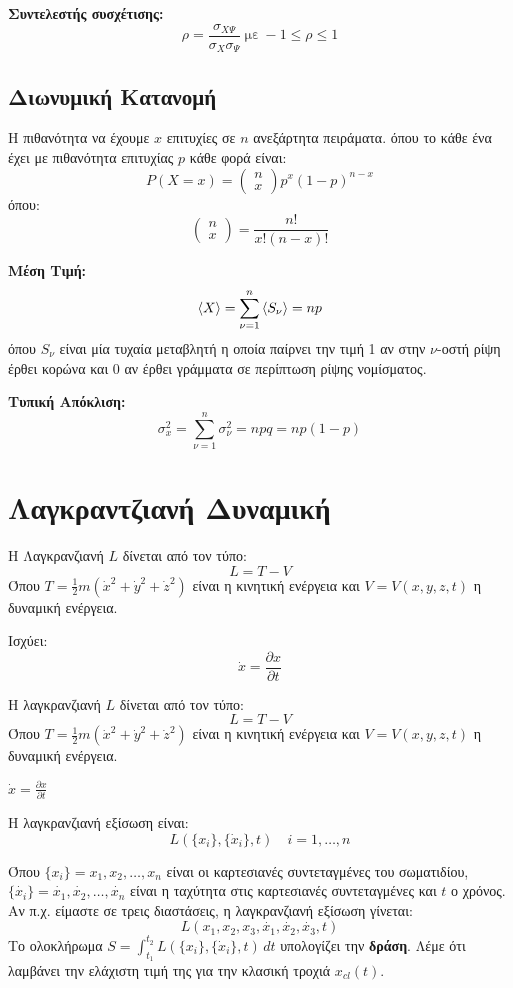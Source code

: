 \documentclass[11pt, oneside]{article}   	%
\newcommand{\definition}[1]{
	\begin{tcolorbox}[colback=blue!5!white,colframe=blue!75!black,title=\textbf{Ορισμός}]
		\begin{center}
			#1
		\end{center}
	\end{tcolorbox}
}
\newcommand{\note}[1]{
	\begin{tcolorbox}[colback=yellow!5!white,colframe=yellow!75!black,title=\textbf{Σημείωση}]
		\begin{center}
			#1
		\end{center}
	\end{tcolorbox}
}
\begin{document}
\definition{\textbf{Συντελεστής συσχέτισης:}\[\rho = \frac{\sigma_{X\Psi}}{\sigma_X \sigma_\Psi} \ \text{με} \ -1 \leq \rho \leq 1\]}

\subsection{Διωνυμική Κατανομή}

\definition{Η πιθανότητα να έχουμε 
$x$ επιτυχίες σε 
$n$ ανεξάρτητα πειράματα. όπου το κάθε ένα έχει με πιθανότητα επιτυχίας
$p$ κάθε φορά είναι:
\[P(X=x) = \begin{pmatrix}
n \\ x
\end{pmatrix} p^x (1-p)^{n-x}\] όπου: \[\begin{pmatrix} n \\ x \end{pmatrix} = \frac{n!}{x!(n-x)!}\]}

\definition{\textbf{Μέση Τιμή:}\[\braket{X} = \sum_{\nu=1}^n \braket{S_\nu} = np\] όπου $S_\nu$ είναι μία τυχαία μεταβλητή η οποία παίρνει την τιμή 1 αν στην $\nu$-οστή ρίψη έρθει κορώνα και 0 αν έρθει γράμματα σε περίπτωση ρίψης νομίσματος.}

\definition{\textbf{Τυπική Απόκλιση:}\[\sigma_x^2 =
 \sum_{\nu=1}^n \sigma_\nu^2 =
  npq = np(1-p)\]}
  
\section{Λαγκραντζιανή Δυναμική}

\definition{H Λαγκρανζιανή $L$ δίνεται από τον τύπο:\[L=T-V\] Όπου $T = \frac 1 2 m(\dot{x}^2 + \dot{y}^2 + \dot{z}^2)$ είναι η κινητική ενέργεια και $V=V(x,y,z,t)$ η δυναμική ενέργεια.}

\note{Ισχύει: \[\dot{x}=\frac{\partial x}{\partial t}\]}

Η λαγκρανζιανή $L$ δίνεται από τον τύπο:
\[L=T-V\]
Όπου $T = \frac 1 2 m(\dot{x}^2 + \dot{y}^2 + \dot{z}^2)$ είναι η κινητική ενέργεια και $V=V(x,y,z,t)$ η δυναμική ενέργεια.

\note{$\dot{x} = \frac{\partial x}{\partial t}$}

Η λαγκρανζιανή εξίσωση είναι:
\[L(\{x_i\},\{\dot{x}_i\},t) \quad i=1,\dots,n\]

Όπου $\{x_i\} = x_1,x_2,\dots,x_n$ είναι οι καρτεσιανές συντεταγμένες του σωματιδίου, $\{\dot{x_i}\} = \dot{x_1},\dot{x_2},\dots,\dot{x_n}$ είναι η ταχύτητα στις καρτεσιανές συντεταγμένες και $t$ ο χρόνος. Αν π.χ. είμαστε σε τρεις διαστάσεις, η λαγκρανζιανή εξίσωση γίνεται:
\[L(x_1,x_2,x_3,\dot{x_1},\dot{x_2},\dot{x_3},t)\]
Το ολοκλήρωμα $S = \int_{t_1}^{t_2} L(\{x_i\},\{\dot{x}_i\},t) \, dt$ υπολογίζει την \textbf{δράση}. Λέμε ότι λαμβάνει την ελάχιστη τιμή της για την κλασική τροχιά $x_{cl}(t)$.
\end{document}
